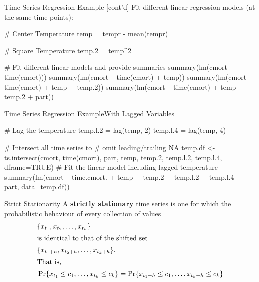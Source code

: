 \documentclass[ignorenonframetext,xcolor=x11names]{beamer}
\begin{document}
\begin{frame}[fragile]{Time Series Regression Example \small [cont'd]}
Fit different linear regression models (at the same time points):
\begin{Rcode}
# Center Temperature
temp = tempr - mean(tempr)

# Square Temperature
temp.2 = temp^2

# Fit different linear models and provide summaries
summary(lm(cmort ~ time(cmort)))
summary(lm(cmort ~ time(cmort) + temp))
summary(lm(cmort ~ time(cmort) + temp + temp.2))
summary(lm(cmort ~ time(cmort) + temp + temp.2 + part))
\end{Rcode}
\end{frame}

\begin{frame}[fragile]{Time Series Regression Example}{With Lagged Variables}

\begin{Rcode}
# Lag the temperature
temp.l.2 = lag(temp, 2)
temp.l.4 = lag(temp, 4)

# Intersect all time series to
# omit leading/trailing NA
temp.df <- ts.intersect(cmort, time(cmort), part, 
                        temp, temp.2, temp.l.2, 
                        temp.l.4,
                        dframe=TRUE)
# Fit the linear model including lagged temperature
summary(lm(cmort ~ time.cmort. + temp + temp.2 + 
                   temp.l.2 + temp.l.4 + part, 
           data=temp.df))
\end{Rcode}
\end{frame}


\begin{frame}{Strict Stationarity}
A \textbf{strictly stationary} time series is one for which the probabilistic behaviour of every collection of values
\begin{align*}&\{x_{t_1}, x_{t_2}, \ldots, x_{t_k} \} \\
\intertext{is identical to that of the shifted set}
&\{x_{t_1+h}, x_{t_2+h}, \ldots, x_{t_k + h} \}. \\
\intertext{That is,}
&\Pr \{ x_{t_1} \leq c_1, \ldots, x_{t_k} \leq c_k \} = \Pr \{ x_{t_1+h}\leq c_1, \ldots , x_{t_k+h} \leq c_k \}
\end{align*}
\end{frame}
\end{document}
